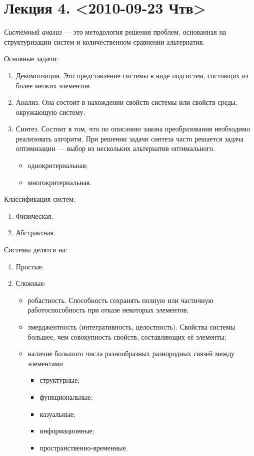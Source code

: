 \documentclass[12pt, russian, oneside, article]{ncc}
\begin{document}
\section{Лекция 4. <2010-09-23 Чтв>}
\label{sec-4}


\emph{Системный анализ} --- это методология решения проблем, основанная на структуризации систем и количественном сравнении альтернатив.

Основные задачи:
\begin{enumerate}
\item Декомпозиция. Это представление системы в виде подсистем, состоящих из более мелких элементов.
\item Анализ. Она состоит в нахождении свойств системы или свойств среды, окружающую систему.
\item Синтез. Состоит в том, что по описанию закона преобразования необходимо реализовать алгоритм. При решении задачи синтеза часто решается задача оптимизации --- выбор из нескольких альтернатив оптимального.

\begin{itemize}
\item однокритериальная;
\item многокритериальная.
\end{itemize}

\end{enumerate}

Классификация систем:
\begin{enumerate}
\item Физическая.
\item Абстрактная.
\end{enumerate}

Системы делятся на:
\begin{enumerate}
\item Простые.
\item Сложные:

\begin{itemize}
\item робастность. Способность сохранять полную или частичную работоспособность при отказе некоторых элементов;
\item эмерджентность (интегративность, целостность). Свойства системы большее, чем совокупность свойств, составляющих её элементы;
\item наличие большого числа разнообразных разнородных связей между элементами

\begin{itemize}
\item структурные;
\item функциональные;
\item казуальные;
\item информационные;
\item пространственно-временные.
\end{itemize}

\end{itemize}

\end{enumerate}
\end{document}
